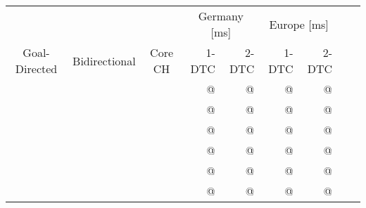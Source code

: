 \begin{tabular}{cccrrrrrr}
	\toprule
	              &               &         & \multicolumn{2}{c}{Germany [\si{\milli\second}]} & \multicolumn{2}{c}{Europe [\si{\milli\second}]}                 \\
	Goal-Directed & Bidirectional & Core CH & 1-DTC                                            & 2-DTC                                           & 1-DTC & 2-DTC \\
	\midrule
	\xmark        & \xmark        & \xmark  & @                                                & @                                               & @     & @     \\
	\cmark        & \xmark        & \xmark  & @                                                & @                                               & @     & @     \\
	\xmark        & \cmark        & \xmark  & @                                                & @                                               & @     & @     \\
	\cmark        & \cmark        & \xmark  & @                                                & @                                               & @     & @     \\
	\xmark        & \cmark        & \cmark  & @                                                & @                                               & @     & @     \\
	\cmark        & \cmark        & \cmark  & @                                                & @                                               & @     & @     \\
	\bottomrule
\end{tabular}